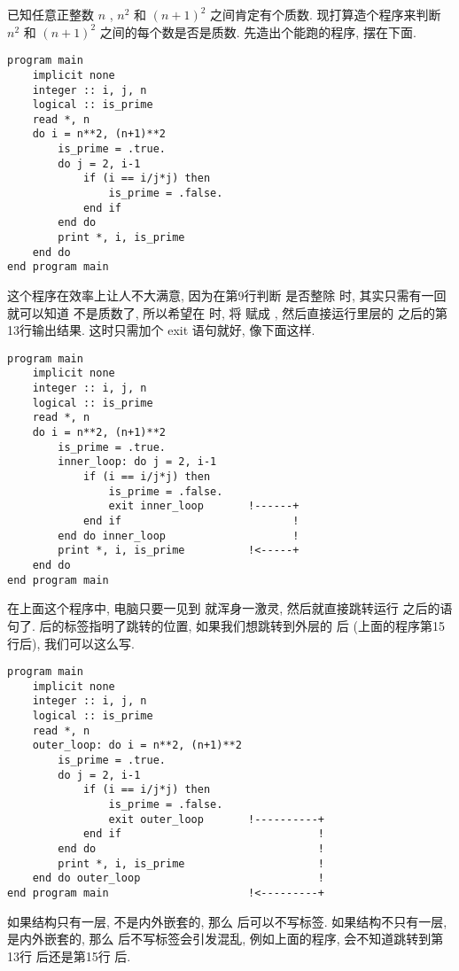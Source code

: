 已知任意正整数 $n$ , $n^2$ 和 $(n+1)^2$ 之间肯定有个质数. 现打算造个程序来判断 $n^2$ 和 $(n+1)^2$ 之间的每个数是否是质数. 先造出个能跑的程序, 摆在下面.
\begin{lstlisting}
program main
    implicit none
    integer :: i, j, n
    logical :: is_prime
    read *, n
    do i = n**2, (n+1)**2
        is_prime = .true.
        do j = 2, i-1
            if (i == i/j*j) then
                is_prime = .false.
            end if
        end do
        print *, i, is_prime
    end do
end program main
\end{lstlisting}
这个程序在效率上让人不大满意, 因为在第9行判断  是否整除  时, 其实只需有一回  就可以知道  不是质数了, 所以希望在  时, 将  赋成 , 然后直接运行里层的  之后的第13行输出结果. 这时只需加个 exit 语句就好, 像下面这样.
\begin{lstlisting}
program main
    implicit none
    integer :: i, j, n
    logical :: is_prime
    read *, n
    do i = n**2, (n+1)**2
        is_prime = .true.
        inner_loop: do j = 2, i-1
            if (i == i/j*j) then
                is_prime = .false.
                exit inner_loop       !------+
            end if                           !
        end do inner_loop                    !
        print *, i, is_prime          !<-----+
    end do
end program main
\end{lstlisting}
在上面这个程序中, 电脑只要一见到  就浑身一激灵, 然后就直接跳转运行  之后的语句了.  后的标签指明了跳转的位置, 如果我们想跳转到外层的  后 (上面的程序第15行后), 我们可以这么写.
\begin{lstlisting}
program main
    implicit none
    integer :: i, j, n
    logical :: is_prime
    read *, n
    outer_loop: do i = n**2, (n+1)**2
        is_prime = .true.
        do j = 2, i-1
            if (i == i/j*j) then
                is_prime = .false.
                exit outer_loop       !----------+
            end if                               !
        end do                                   !
        print *, i, is_prime                     !
    end do outer_loop                            !
end program main                      !<---------+
\end{lstlisting}

如果结构只有一层, 不是内外嵌套的, 那么  后可以不写标签. 如果结构不只有一层, 是内外嵌套的, 那么  后不写标签会引发混乱, 例如上面的程序, 会不知道跳转到第13行  后还是第15行  后.

